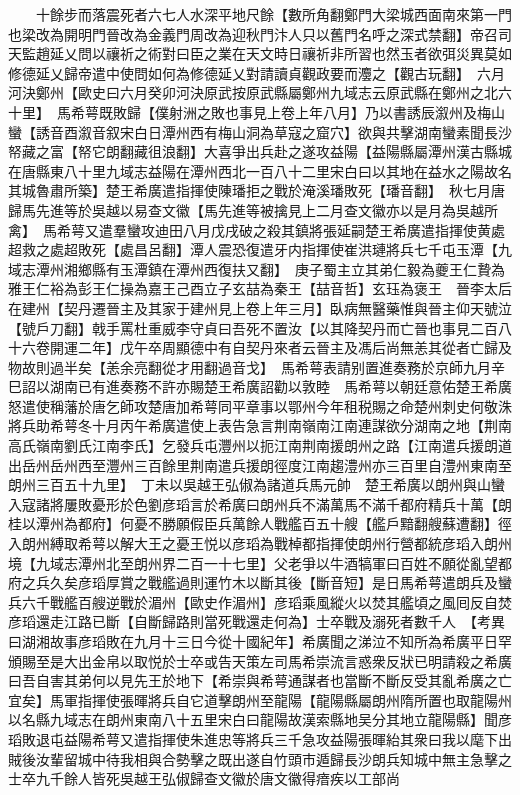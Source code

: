 　　十餘步而落震死者六七人水深平地尺餘【數所角翻鄭門大梁城西面南來第一門也梁改為開明門晉改為金義門周改為迎秋門汴人只以舊門名呼之深式禁翻】帝召司天監趙延乂問以禳祈之術對曰臣之業在天文時日禳祈非所習也然玉者欲弭災異莫如修德延乂歸帝遣中使問如何為修德延乂對請讀貞觀政要而灋之【觀古玩翻】　六月河決鄭州【歐史曰六月癸卯河決原武按原武縣屬鄭州九域志云原武縣在鄭州之北六十里】　馬希萼既敗歸【僕射洲之敗也事見上卷上年八月】乃以書誘辰溆州及梅山蠻【誘音酉溆音叙宋白日潭州西有梅山洞為草寇之窟穴】欲與共擊湖南蠻素聞長沙帑藏之富【帑它朗翻藏徂浪翻】大喜爭出兵赴之遂攻益陽【益陽縣屬潭州漢古縣城在唐縣東八十里九域志益陽在潭州西北一百八十二里宋白曰以其地在益水之陽故名其城魯肅所築】楚王希廣遣指揮使陳璠拒之戰於淹溪璠敗死【璠音翻】　秋七月唐歸馬先進等於吳越以易查文徽【馬先進等被擒見上二月查文徽亦以是月為吳越所禽】　馬希萼又遣羣蠻攻迪田八月戊戌破之殺其鎮將張延嗣楚王希廣遣指揮使黄處超救之處超敗死【處昌呂翻】潭人震恐復遣牙内指揮使崔洪璉將兵七千屯玉潭【九域志潭州湘鄉縣有玉潭鎮在潭州西復扶又翻】　庚子蜀主立其弟仁毅為夔王仁贄為雅王仁裕為彭王仁操為嘉王己酉立子玄喆為秦王【喆音哲】玄珏為褒王　晉李太后在建州【契丹遷晉主及其家于建州見上卷上年三月】臥病無醫藥惟與晉主仰天號泣【號戶刀翻】戟手罵杜重威李守貞曰吾死不置汝【以其降契丹而亡晉也事見二百八十六卷開運二年】戊午卒周顯德中有自契丹來者云晉主及馮后尚無恙其從者亡歸及物故則過半矣【恙余亮翻從才用翻過音戈】　馬希萼表請别置進奏務於京師九月辛巳詔以湖南已有進奏務不許亦賜楚王希廣詔勸以敦睦　馬希萼以朝廷意佑楚王希廣怒遣使稱藩於唐乞師攻楚唐加希萼同平章事以鄂州今年租税賜之命楚州刺史何敬洙將兵助希萼冬十月丙午希廣遣使上表告急言荆南嶺南江南連謀欲分湖南之地【荆南高氏嶺南劉氏江南李氏】乞發兵屯灃州以扼江南荆南援朗州之路【江南遣兵援朗道出岳州岳州西至灃州三百餘里荆南遣兵援朗徑度江南趨澧州亦三百里自澧州東南至朗州三百五十九里】　丁未以吳越王弘俶為諸道兵馬元帥　楚王希廣以朗州與山蠻入寇諸將屢敗憂形於色劉彦瑫言於希廣曰朗州兵不滿萬馬不滿千都府精兵十萬【朗桂以潭州為都府】何憂不勝願假臣兵萬餘人戰艦百五十艘【艦戶黯翻艘蘇遭翻】徑入朗州縛取希萼以解大王之憂王悦以彦瑫為戰棹都指揮使朗州行營都統彦瑫入朗州境【九域志潭州北至朗州界二百一十七里】父老爭以牛酒犒軍曰百姓不願從亂望都府之兵久矣彦瑫厚賞之戰艦過則運竹木以斷其後【斷音短】是日馬希萼遣朗兵及蠻兵六千戰艦百艘逆戰於湄州【歐史作湄州】彦瑫乘風縱火以焚其艦頃之風囘反自焚彦瑫還走江路已斷【自斷歸路則當死戰還走何為】士卒戰及溺死者數千人　【考異曰湖湘故事彦瑫敗在九月十三日今從十國紀年】希廣聞之涕泣不知所為希廣平日罕頒賜至是大出金帛以取悦於士卒或告天策左司馬希崇流言惑衆反狀已明請殺之希廣曰吾自害其弟何以見先王於地下【希崇與希萼通謀者也當斷不斷反受其亂希廣之亡宜矣】馬軍指揮使張暉將兵自它道擊朗州至龍陽【龍陽縣屬朗州隋所置也取龍陽州以名縣九域志在朗州東南八十五里宋白曰龍陽故漢索縣地吴分其地立龍陽縣】聞彦瑫敗退屯益陽希萼又遣指揮使朱進忠等將兵三千急攻益陽張暉紿其衆曰我以麾下出賊後汝輩留城中待我相與合勢擊之既出遂自竹頭市遁歸長沙朗兵知城中無主急擊之士卒九千餘人皆死吳越王弘俶歸查文徽於唐文徽得瘖疾以工部尚

